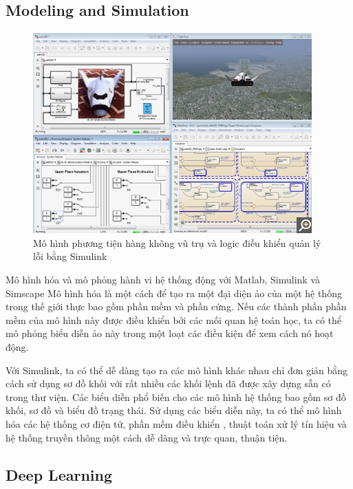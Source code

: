 \documentclass[12pt,a4paper]{report}
\begin{document}
    \subsection{Modeling and Simulation}
    \begin{figure}[h]
    	\centering
    		\includegraphics[scale=1]{simulinkModel.png}
    			\caption{Mô hình phương tiện hàng không vũ trụ và logic điều khiển quản lý lỗi bằng Simulink}
    \end{figure}
    Mô hình hóa và mô phỏng hành vi hệ thống động với Matlab, Simulink và Simscape
    Mô hình hóa là một cách để tạo ra một đại diện ảo của một hệ thống trong thế giới thực bao gồm phần mềm và phần cứng. Nếu các thành phần phần mềm của mô hình này được điều khiển bởi các mối quan hệ toán học, ta có thể mô phỏng biểu diễn ảo này trong một loạt các điều kiện để xem cách nó hoạt động.
    
    
    
    Với Simulink, ta có thể dễ dàng tạo ra các mô hình khác nhau chỉ đơn giản bằng cách sử dụng sơ đồ khối với rất nhiều các khối lệnh đã được xây dựng sẵn có trong thư viện. Các biểu diễn phổ biến cho các mô hình hệ thống bao gồm sơ đồ khối, sơ đồ và biểu đồ trạng thái. Sử dụng các biểu diễn này, ta có thể mô hình hóa các hệ thống cơ điện tử, phần mềm điều khiển , thuật toán xử lý tín hiệu và hệ thống truyền thông một cách dễ dàng và trực quan, thuận tiện.
    
    	
    \subsection{Deep Learning}
    
\end{document}
